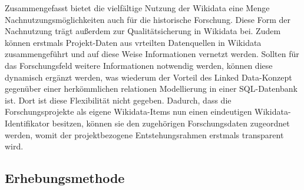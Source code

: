 Zusammengefasst bietet die vielfältige Nutzung der Wikidata eine Menge Nachnutzungsmöglichkeiten auch für die historische Forschung. Diese Form der Nachnutzung trägt außerdem zur Qualitätsicherung in Wikidata bei. Zudem können erstmals Projekt-Daten aus vrteilten Datenquellen in Wikidata zusammengeführt und auf diese Weise Informationen vernetzt werden. Sollten für das Forschungsfeld weitere Informationen notwendig werden, können diese dynamisch ergänzt werden, was wiederum der Vorteil des Linked Data-Konzept gegenüber einer herkömmlichen relationen Modellierung in einer SQL-Datenbank ist. Dort ist diese Flexibilität nicht gegeben. Dadurch, dass die Forschungsprojekte als eigene Wikidata-Items nun einen eindeutigen Wikidata-Identifikator besitzen, können sie den zugehörigen Forschungsdaten zugeordnet werden, womit der projektbezogene Entstehungsrahmen erstmals transparent wird.

\subsection{Erhebungsmethode}

